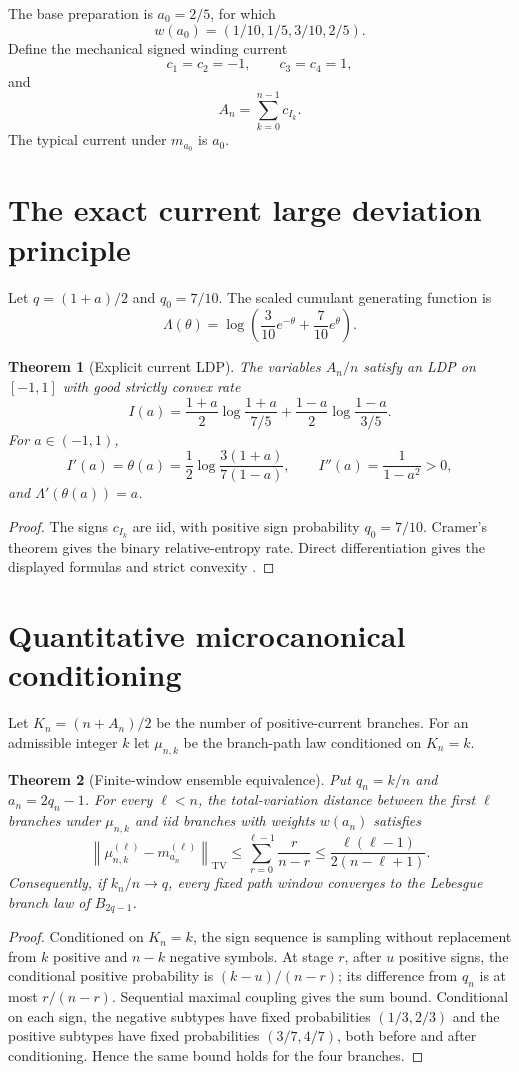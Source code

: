 \documentclass[11pt,reqno]{amsart}
\newtheorem{theorem}{Theorem}[section]
\theoremstyle{remark}
\newcommand{\TV}{\mathrm{TV}}
\begin{document}
The base preparation is $a_0=2/5$, for which
\[
 w(a_0)=(1/10,1/5,3/10,2/5).
\]
Define the mechanical signed winding current
\[
 c_1=c_2=-1,\qquad c_3=c_4=1,
\]
and
\[
 A_n=\sum_{k=0}^{n-1}c_{I_k}.
\]
The typical current under $m_{a_0}$ is $a_0$.

\section{The exact current large deviation principle}
Let $q=(1+a)/2$ and $q_0=7/10$.  The scaled cumulant generating function is
\[
 \Lambda(\theta)
 =\log\left(\frac3{10}e^{-\theta}+\frac7{10}e^\theta\right).
\]

\begin{theorem}[Explicit current LDP]\label{thm:ldp}
The variables $A_n/n$ satisfy an LDP on $[-1,1]$ with good strictly convex rate
\[
 I(a)=\frac{1+a}{2}\log\frac{1+a}{7/5}
      +\frac{1-a}{2}\log\frac{1-a}{3/5}.
\]
For $a\in(-1,1)$,
\[
 I'(a)=\theta(a)=\frac12\log\frac{3(1+a)}{7(1-a)},
 \qquad I''(a)=\frac1{1-a^2}>0,
\]
and $\Lambda'(\theta(a))=a$.
\end{theorem}
\begin{proof}
The signs $c_{I_k}$ are iid, with positive sign probability $q_0=7/10$.
Cramer's theorem gives the binary relative-entropy rate.  Direct
differentiation gives the displayed formulas and strict convexity
\cite{DemboZeitouni1998,Kifer1990}.
\end{proof}

\section{Quantitative microcanonical conditioning}
Let $K_n=(n+A_n)/2$ be the number of positive-current branches.  For an
admissible integer $k$ let $\mu_{n,k}$ be the branch-path law conditioned on
$K_n=k$.

\begin{theorem}[Finite-window ensemble equivalence]\label{thm:microcanonical}
Put $q_n=k/n$ and $a_n=2q_n-1$.  For every $\ell<n$, the total-variation
distance between the first $\ell$ branches under $\mu_{n,k}$ and iid branches
with weights $w(a_n)$ satisfies
\[
 \left\|
 \mu_{n,k}^{(\ell)}-m_{a_n}^{(\ell)}
 \right\|_{\TV}
 \le
 \sum_{r=0}^{\ell-1}\frac{r}{n-r}
 \le \frac{\ell(\ell-1)}{2(n-\ell+1)}.
\]
Consequently, if $k_n/n\to q$, every fixed path window converges to the
Lebesgue branch law of $B_{2q-1}$.
\end{theorem}
\begin{proof}
Conditioned on $K_n=k$, the sign sequence is sampling without replacement
from $k$ positive and $n-k$ negative symbols.  At stage $r$, after $u$
positive signs, the conditional positive probability is $(k-u)/(n-r)$; its
difference from $q_n$ is at most $r/(n-r)$.  Sequential maximal coupling gives
the sum bound.  Conditional on each sign, the negative subtypes have fixed
probabilities $(1/3,2/3)$ and the positive subtypes have fixed probabilities
$(3/7,4/7)$, both before and after conditioning.  Hence the same bound holds
for the four branches.
\end{proof}
\end{document}

